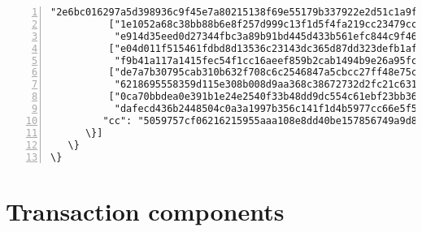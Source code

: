 \begin{appendices}
\begin{Verbatim}[commandchars=\\\{\}, numbers=left]
          "2e6bc016297a5d398936c9f45e7a80215138f69e55179b337922e2d51c1a9f00"], 
          ["1e1052a68c38bb88b6e8f257d999c13f1d5f4fa219cc23479ccbfa6b14b5960a",
           "e914d35eed0d27344fbc3a89b91bd445d433b561efc844c9f466a61ebb5f6d09"], 
          ["e04d011f515461fdbd8d13536c23143dc365d87dd323defb1af834e540a8fc0e",
           "f9b41a117a1415fec54f1cc16aeef859b2cab1494b9e26a95fc9eaf4f571fa00"], 
          ["de7a7b30795cab310b632f708c6c2546847a5cbcc27ff48e75c1556c3f6f180c",
           "6218695558359d115e308b008d9aa368c38672732d2fc21c6317ad7d15918c05"], 
          ["0ca70bbdea0e391b1e24e2540f33b48dd9dc554c61ebf23bb3691aab5094e40f",
           "dafecd436b2448504c0a3a1997b356c141f1d4b5977cc66e5f55592f13731501"]],        
         "cc": "5059757cf06216215955aaa108e8dd40be157856749a9d883bcac611e395a409"
      \}]
   \}
\}

\end{Verbatim}


\section*{Transaction components}
	

\end{appendices}
